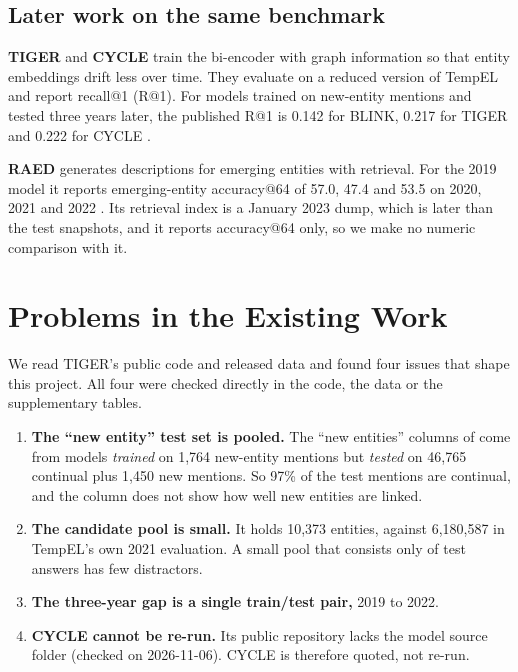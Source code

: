 \documentclass[conference]{IEEEtran}
\begin{document}
\subsection{Later work on the same benchmark}

\textbf{TIGER} \cite{tiger} and \textbf{CYCLE} \cite{cycle} train the bi-encoder with graph
information so that entity embeddings drift less over time. They evaluate on a reduced version of
TempEL and report recall@1 (R@1). For models trained on new-entity mentions and tested three years
later, the published R@1 is 0.142 for BLINK, 0.217 for TIGER and 0.222 for CYCLE \cite{tiger,cycle}.

\textbf{RAED} \cite{raed} generates descriptions for emerging entities with retrieval. For the 2019
model it reports emerging-entity accuracy@64 of 57.0, 47.4 and 53.5 on 2020, 2021 and 2022
\cite{raed}. Its retrieval index is a January 2023 dump, which is later than the test snapshots, and it
reports accuracy@64 only, so we make no numeric comparison with it.

\section{Problems in the Existing Work}

We read TIGER's public code and released data \cite{tigercode,tigerdata} and found four issues that
shape this project. All four were checked directly in the code, the data or the supplementary tables.

\begin{enumerate}
\item \textbf{The ``new entity'' test set is pooled.} The ``new entities'' columns of
\cite{tiger,cycle} come from models \emph{trained} on 1,764 new-entity mentions but \emph{tested} on
46,765 continual plus 1,450 new mentions. So 97\% of the test mentions are continual, and the column
does not show how well new entities are linked.
\item \textbf{The candidate pool is small.} It holds 10,373 entities, against 6,180,587 in TempEL's own
2021 evaluation. A small pool that consists only of test answers has few distractors.
\item \textbf{The three-year gap is a single train/test pair,} 2019 to 2022.
\item \textbf{CYCLE cannot be re-run.} Its public repository lacks the model source folder (checked on
2026-11-06). CYCLE is therefore quoted, not re-run.
\end{enumerate}
\end{document}
